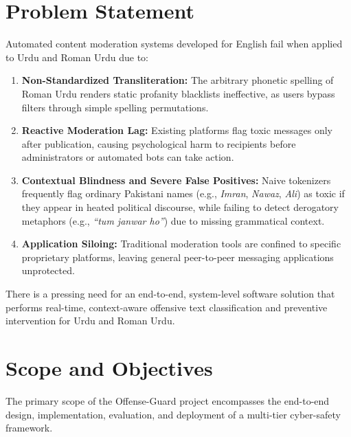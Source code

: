 \documentclass[A4paper,12pt]{report}
\theoremstyle{plain}
\theoremstyle{definition}
\theoremstyle{remark}
\numberwithin{equation}{section}
\begin{document}
\section{Problem Statement}
Automated content moderation systems developed for English fail when applied to Urdu and Roman Urdu due to:
\begin{enumerate}[leftmargin=*]
    \item \textbf{Non-Standardized Transliteration:} The arbitrary phonetic spelling of Roman Urdu renders static profanity blacklists ineffective, as users bypass filters through simple spelling permutations.
    \item \textbf{Reactive Moderation Lag:} Existing platforms flag toxic messages only after publication, causing psychological harm to recipients before administrators or automated bots can take action.
    \item \textbf{Contextual Blindness and Severe False Positives:} Naive tokenizers frequently flag ordinary Pakistani names (e.g., \textit{Imran}, \textit{Nawaz}, \textit{Ali}) as toxic if they appear in heated political discourse, while failing to detect derogatory metaphors (e.g., \textit{``tum janwar ho''}) due to missing grammatical context.
    \item \textbf{Application Siloing:} Traditional moderation tools are confined to specific proprietary platforms, leaving general peer-to-peer messaging applications unprotected.
\end{enumerate}
There is a pressing need for an end-to-end, system-level software solution that performs real-time, context-aware offensive text classification and preventive intervention for Urdu and Roman Urdu.

\section{Scope and Objectives}
The primary scope of the Offense-Guard project encompasses the end-to-end design, implementation, evaluation, and deployment of a multi-tier cyber-safety framework.
\end{document}

